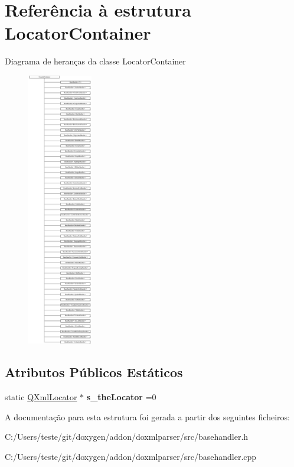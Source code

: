\hypertarget{struct_locator_container}{\section{Referência à estrutura Locator\-Container}
\label{struct_locator_container}
}
Diagrama de heranças da classe Locator\-Container\begin{figure}[H]
\begin{center}
\leavevmode
\includegraphics[height=12.000000cm]{struct_locator_container}
\end{center}
\end{figure}
\subsection*{Atributos Públicos Estáticos}
\begin{DoxyCompactItemize}
\item 
\hypertarget{struct_locator_container_aef5a19a4af3a1e5314a72cd286d97eb4}{static \hyperlink{class_q_xml_locator}{Q\-Xml\-Locator} $\ast$ {\bfseries s\-\_\-the\-Locator} =0}\label{struct_locator_container_aef5a19a4af3a1e5314a72cd286d97eb4}

\end{DoxyCompactItemize}


A documentação para esta estrutura foi gerada a partir dos seguintes ficheiros\-:\begin{DoxyCompactItemize}
\item 
C\-:/\-Users/teste/git/doxygen/addon/doxmlparser/src/basehandler.\-h\item 
C\-:/\-Users/teste/git/doxygen/addon/doxmlparser/src/basehandler.\-cpp\end{DoxyCompactItemize}
